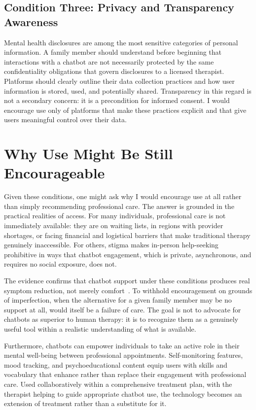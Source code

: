 \documentclass[11pt,showkeys]{essay}
\begin{document}
\subsection{Condition Three: Privacy and Transparency Awareness}

Mental health disclosures are among the most sensitive categories of personal information. A family member should understand before beginning that interactions with a chatbot are not necessarily protected by the same confidentiality obligations that govern disclosures to a licensed therapist. Platforms should clearly outline their data collection practices and how user information is stored, used, and potentially shared. Transparency in this regard is not a secondary concern: it is a precondition for informed consent. I would encourage use only of platforms that make these practices explicit and that give users meaningful control over their data.

\section{Why Use Might Be Still Encourageable}

Given these conditions, one might ask why I would encourage use at all rather than simply recommending professional care. The answer is grounded in the practical realities of access. For many individuals, professional care is not immediately available: they are on waiting lists, in regions with provider shortages, or facing financial and logistical barriers that make traditional therapy genuinely inaccessible. For others, stigma makes in-person help-seeking prohibitive in ways that chatbot engagement, which is private, asynchronous, and requires no social exposure, does not.

The evidence confirms that chatbot support under these conditions produces real symptom reduction, not merely comfort~\cite{fitzpatrick_delivering_2017,jabir_evaluating_2023}. To withhold encouragement on grounds of imperfection, when the alternative for a given family member may be no support at all, would itself be a failure of care. The goal is not to advocate for chatbots as superior to human therapy: it is to recognize them as a genuinely useful tool within a realistic understanding of what is available.

Furthermore, chatbots can empower individuals to take an active role in their mental well-being between professional appointments. Self-monitoring features, mood tracking, and psychoeducational content equip users with skills and vocabulary that enhance rather than replace their engagement with professional care. Used collaboratively within a comprehensive treatment plan, with the therapist helping to guide appropriate chatbot use, the technology becomes an extension of treatment rather than a substitute for it.
\end{document}
